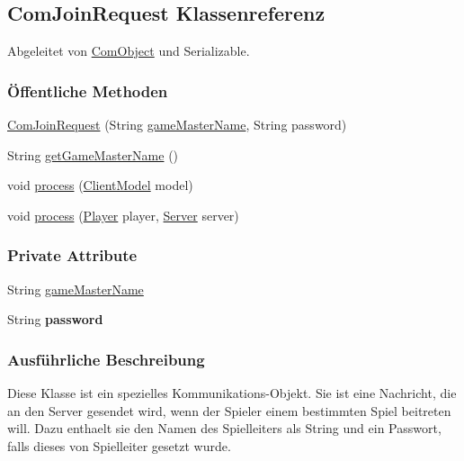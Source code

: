 \hypertarget{a00033}{\subsection{Com\-Join\-Request Klassenreferenz}
\label{a00033}
}


Abgeleitet von \hyperlink{a00037}{Com\-Object} und Serializable.

\subsubsection*{Öffentliche Methoden}
\begin{DoxyCompactItemize}
\item 
\hyperlink{a00033_a65c627c4c6752c8b94d729645b03846f}{Com\-Join\-Request} (String \hyperlink{a00033_ad3f74f58e5b41a74c02e21e0407280b8}{game\-Master\-Name}, String password)
\item 
String \hyperlink{a00033_a3acba35c72b8d4dcf49579142910672f}{get\-Game\-Master\-Name} ()
\item 
void \hyperlink{a00033_a758d7005755a181717f238f714d87dd2}{process} (\hyperlink{a00003}{Client\-Model} model)
\item 
void \hyperlink{a00033_ac67b5ce3ec03d48ef1e6caad6e49c902}{process} (\hyperlink{a00076}{Player} player, \hyperlink{a00077}{Server} server)
\end{DoxyCompactItemize}
\subsubsection*{Private Attribute}
\begin{DoxyCompactItemize}
\item 
String \hyperlink{a00033_ad3f74f58e5b41a74c02e21e0407280b8}{game\-Master\-Name}
\item 
\hypertarget{a00033_acbd76b816d055b7a642c219fd9751020}{String {\bfseries password}}\label{a00033_acbd76b816d055b7a642c219fd9751020}

\end{DoxyCompactItemize}


\subsubsection{Ausführliche Beschreibung}
Diese Klasse ist ein spezielles Kommunikations-\/\-Objekt. Sie ist eine Nachricht, die an den Server gesendet wird, wenn der Spieler einem bestimmten Spiel beitreten will. Dazu enthaelt sie den Namen des Spielleiters als String und ein Passwort, falls dieses von Spielleiter gesetzt wurde. 

